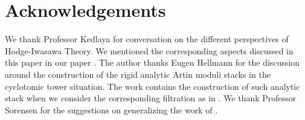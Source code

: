 \documentclass[12pt]{article}
\begin{document}
\newpage
\section*{Acknowledgements}
We thank Professor Kedlaya for conversation on the different perspectives  of Hodge-Iwasawa Theory. We mentioned the corresponding aspects discussed in this paper in our paper \cite{T2}. The author thanks Eugen Hellmann for the discussion around the construction of the rigid analytic Artin moduli stacks in the cyclotomic tower situation. The work \cite{EGH} contains the construction of such analytic stack when we consider the corresponding filtration as in \cite{He1}. We thank Professor Sorensen for the suggestions on generalizing the work of \cite{BS}. 





\newpage
\end{document}
